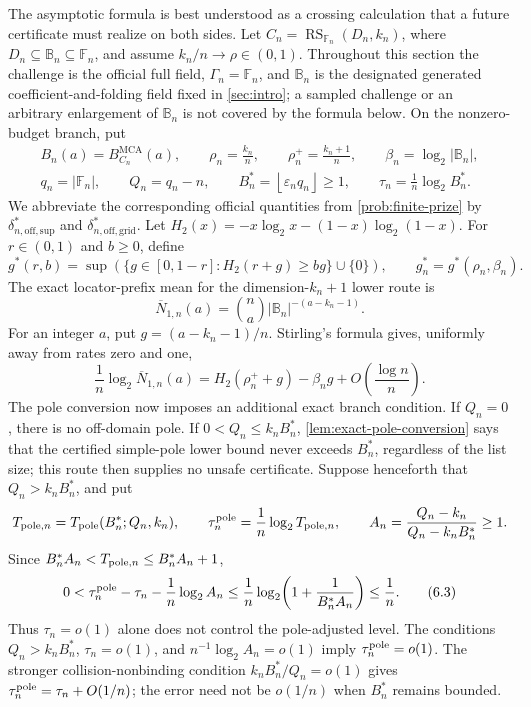 \documentclass[a4paper,11pt]{amsart}
\theoremstyle{remark}
\DeclareMathOperator{\RS}{RS}
\DeclareMathOperator{\MCA}{MCA}
\newcommand{\F}{\mathbb F}
\newcommand{\B}{\mathbb B}
\newcommand{\Gam}{\Gamma}
\newcommand{\barN}{\overline N}
\newcommand{\abs}[1]{\lvert#1\rvert}
\newcommand{\floor}[1]{\left\lfloor#1\right\rfloor}
\begin{document}
The asymptotic formula is best understood as a crossing calculation that a
future certificate must realize on both sides.  Let
\(C_n=\RS_{\F_n}(D_n,k_n)\), where \(D_n\subseteq\B_n\subseteq\F_n\), and
assume \(k_n/n\to\rho\in(0,1)\).  Throughout this section the challenge is
the official full field, \(\Gam_n=\F_n\), and \(\B_n\) is the designated
generated coefficient-and-folding field fixed in \cref{sec:intro}; a sampled
challenge or an arbitrary enlargement of \(\B_n\) is not covered by the
formula below.  On the nonzero-budget branch, put
\[
 \begin{gathered}
 B_n(a)=B_{C_n}^{\MCA}(a),\qquad
 \rho_n=\frac{k_n}{n},\qquad \rho_n^+=\frac{k_n+1}{n},\qquad
 \beta_n=\log_2\abs{\B_n},\\
 q_n=\abs{\F_n},\qquad Q_n=q_n-n,\qquad
 B_n^*=\floor{\varepsilon_nq_n}\ge1,\qquad
 \tau_n=\frac1n\log_2B_n^*.
 \end{gathered}
\]
We abbreviate the corresponding official quantities from
\cref{prob:finite-prize} by
\(\delta_{n,\mathrm{off,sup}}^*\) and
\(\delta_{n,\mathrm{off,grid}}^*\).  Let
\(H_2(x)=-x\log_2x-(1-x)\log_2(1-x)\).  For
\(r\in(0,1)\) and \(b\ge0\), define
\[
 g^*(r,b)=\sup\left(\{g\in[0,1-r]:H_2(r+g)\ge bg\}\cup\{0\}\right),
 \qquad g_n^*=g^*(\rho_n,\beta_n).
\]
The exact locator-prefix mean for
the dimension-\(k_n+1\) lower route is
\[
 \barN_{1,n}(a)=\binom na\abs{\B_n}^{-(a-k_n-1)}.    \tag{6.1}\label{eq:identity-mean}
\]
For an integer \(a\), put \(g=(a-k_n-1)/n\).  Stirling's formula gives,
uniformly away from rates zero and one,
\[
 \frac1n\log_2\barN_{1,n}(a)
 =H_2(\rho_n^++g)-\beta_ng+O\!\left(\frac{\log n}{n}\right). \tag{6.2}\label{eq:identity-exponent}
\]
The pole conversion now imposes an additional exact branch condition.  If
\(Q_n=0\), there is no off-domain pole.  If
\(0<Q_n\le k_nB_n^*\), \cref{lem:exact-pole-conversion} says that the
certified simple-pole lower bound never exceeds \(B_n^*\), regardless of the
list size; this route then supplies no unsafe certificate.  Suppose henceforth that
\(Q_n>k_nB_n^*\), and put
\[
 T_{{\rm pole},n}=T_{\rm pole}(B_n^*;Q_n,k_n),\qquad
 \tau_n^{\rm pole}=\frac1n\log_2T_{{\rm pole},n},\qquad
 A_n=\frac{Q_n-k_n}{Q_n-k_nB_n^*}\ge1.
\]
Since \(B_n^*A_n<T_{{\rm pole},n}\le B_n^*A_n+1\),
\[
 0<\tau_n^{\rm pole}-\tau_n-\frac1n\log_2A_n
 \le\frac1n\log_2\!\left(1+\frac1{B_n^*A_n}\right)
 \le\frac1n.                                      \tag{6.3}\label{eq:pole-exponent-comparison}
\]
Thus \(\tau_n=o(1)\) alone does not control the pole-adjusted level.  The
conditions \(Q_n>k_nB_n^*\), \(\tau_n=o(1)\), and
\(n^{-1}\log_2A_n=o(1)\) imply \(\tau_n^{\rm pole}=o(1)\).  The stronger
collision-nonbinding condition \(k_nB_n^*/Q_n=o(1)\) gives
\(\tau_n^{\rm pole}=\tau_n+O(1/n)\); the error need not be \(o(1/n)\) when
\(B_n^*\) remains bounded.
\end{document}
